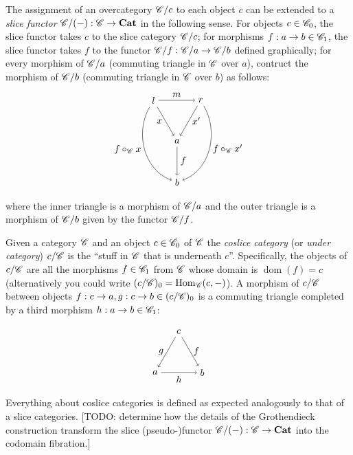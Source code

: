 \documentclass[10pt]{article}
\theoremstyle{definition}
\theoremstyle{remark}
\DeclareMathOperator{\Hom}{Hom}
\DeclareMathOperator{\dom}{dom}
\begin{document}
The assignment of an overcategory $\mathscr{C}/c$ to each object $c$ can be extended to a \textit{slice functor} $\mathscr{C} / (-) : \mathscr{C} \to \mathbf{Cat}$ in the following sense. For objects $c \in \mathscr{C}_0$, the slice functor takes $c$ to the slice category $\mathscr{C}/c$; for morphisms $f : a \to b \in \mathscr{C}_1$, the slice functor takes $f$ to the functor $\mathscr{C} / f : \mathscr{C} / a \to \mathscr{C} / b$ defined graphically; for every morphism of $\mathscr{C} / a$ (commuting triangle in $\mathscr{C}$ over $a$), contruct the morphism of $\mathscr{C} / b$ (commuting triangle in $\mathscr{C}$ over $b$) as follows:
\[
    \begin{tikzpicture}
            \draw (150:1) node(tl){$l$};
            \draw ( 30:1) node(tr){$r$};
            \draw (270:1) node(bm){$a$};
            \draw (270:2.5) node(bb){$b$};

            \draw[->] (tl) to node[below,left ]{$x$}  (bm);
            \draw[->] (tr) to node[below,right]{$x'$} (bm);
            \draw[->] (tl) to[out=-120, in=+160] node[below,left ]{$f \circ_{\catC} x$}  (bb);
            \draw[->] (tr) to[out= -60, in= +20] node[below,right]{$f \circ_{\catC} x'$} (bb);
            \draw[->] (tl) to node[above]{$m$} (tr);
            \draw[->] (bm) to node[right]{$f$} (bb);
    \end{tikzpicture}
\]
where the inner triangle is a morphism of $\mathscr{C}/a$ and the outer triangle is a morphism of $\mathscr{C}/b$ given by the functor $\mathscr{C}/f$.

Given a category $\mathscr{C}$ and an object $c \in \mathscr{C}_0$ of $\mathscr{C}$ the \textit{coslice category} (or \textit{under category}) $c/\mathscr{C}$ is the ``stuff in $\mathscr{C}$ that is underneath $c$''. Specifically, the objects of $c/\mathscr{C}$ are all the morphisms $f \in \mathscr{C}_1$ from $\mathscr{C}$ whose domain is $\dom(f) = c$ (alternatively you could write $(c/\catC)_0 = \Hom_{\catC}(c,-)$). A morphism of $c/\mathscr{C}$ between objects $f : c \to a, g : c \to b \in (c/\mathscr{C})_0$ is a commuting triangle completed by a third morphism $h : a \to b \in \mathscr{C}_1$:

\[
    \begin{tikzpicture}
        \draw (210:1) node(tl){$a$};
        \draw (330:1) node(tr){$b$};
        \draw ( 90:1) node(bm){$c$};

        \draw[<-] (tl) to node[below,left ]{$g$} (bm);
        \draw[<-] (tr) to node[below,right]{$f$} (bm);
        \draw[->] (tl) to node[below]{$h$} (tr);
    \end{tikzpicture}
\]
Everything about coslice categories is defined as expected analogously to that of a slice categories.
\textcolor{red!50!black}{[TODO: determine how the details of the Grothendieck construction transform the slice (pseudo-)functor $\mathscr{C} / (-) : \mathscr{C} \to \mathbf{Cat}$ into the codomain fibration.]}
\end{document}
